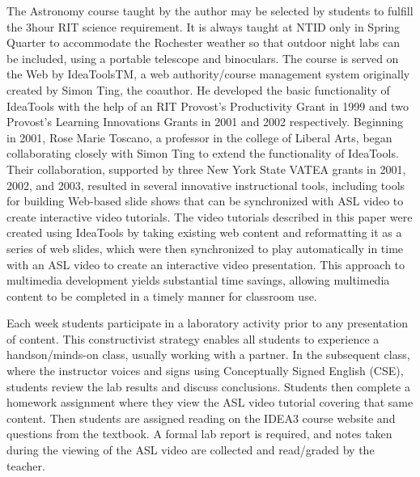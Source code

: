 \documentclass[11.5pt]{sig-alternate} %
\begin{document}
\begin{large}
The Astronomy course taught by the author may be selected by students to fulfill the 3hour RIT science requirement.  It is always taught at NTID only in Spring Quarter to accommodate the Rochester weather so that outdoor night labs can be included, using a portable telescope and binoculars.  The course is served on the Web by IdeaToolsTM, a web authority/course management system originally created by Simon Ting, the coauthor.  He developed the basic functionality of IdeaTools with the help of an RIT Provost’s Productivity Grant in 1999 and two Provost’s Learning Innovations Grants in 2001 and 2002 respectively.  Beginning in 2001, Rose Marie Toscano, a professor in the college of Liberal Arts, began collaborating closely with Simon Ting to extend the functionality of IdeaTools.  Their collaboration, supported by three New York State VATEA grants in 2001, 2002, and 2003, resulted in several innovative instructional tools, including tools for building Web-based slide shows that can be synchronized with ASL video to create interactive video tutorials.  The video tutorials described in this paper were created using IdeaTools by taking existing web content and reformatting it as a series of web slides, which were then synchronized to play automatically in time with an ASL video to create an interactive video presentation.  This approach to multimedia development yields substantial time savings, allowing multimedia content to be completed in a timely manner for classroom use. 
 
Each week students participate in a laboratory activity prior to any presentation of content.  This constructivist strategy enables all students to experience a handson/minds-on class, usually working with a partner.  In the subsequent class, where the instructor voices and signs using Conceptually Signed English (CSE), students review the lab results and discuss conclusions.  Students then complete a homework assignment where they view the ASL video tutorial covering that same content.  Then students are assigned reading on the IDEA3 course website and questions from the textbook.  A formal lab report is required, and notes taken during the viewing of the ASL video are collected and read/graded by the teacher. 
 

\end{large}
\end{document}
